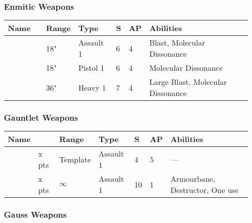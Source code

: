 \subsubsection{Enmitic Weapons}

\label{Enmitic Exterminator} \label{Enmitic Annihilator} \label{Enmitic Disintegrator Pistol}
\noindent
\begin{tabular}{||m{140pt} m{0pt} m{31pt} m{55pt} m{12pt} m{12pt} m{210pt}||}
	\hline
	Name & & Range & Type & S & AP & Abilities \\
	\hline
	\quickref{Enmitic Annihilator} &  & 18" & Assault 1 & 6 & 4 & Blast, Molecular Dissonance \\
	\quickref{Enmitic Disintegrator Pistol} &  & 18" & Pistol 1 & 6 & 4 & Molecular Dissonance \\
	\quickref{Enmitic Exterminator} &  & 36" & Heavy 1 & 7 & 4 & Large Blast, Molecular Dissonance \\
	\hline
\end{tabular}

\subsubsection{Gauntlet Weapons}

\label{Gauntlet of Fire} \label{Tachyon Arrow}
\noindent
\begin{tabular}{||m{110pt} m{30pt} m{31pt} m{55pt} m{12pt} m{12pt} m{210pt}||}
	\hline
	Name & & Range & Type & S & AP & Abilities \\
	\hline
	\quickref{Gauntlet of Fire} & x pts& Template & Assault 1 & 4 & 5 & — \\
	\quickref{Tachyon Arrow} & x pts& $\infty$ & Assault 1 & 10 & 1 & Armourbane, Destructor, One use \\
	\hline
\end{tabular}



\subsubsection{Gauss Weapons}

